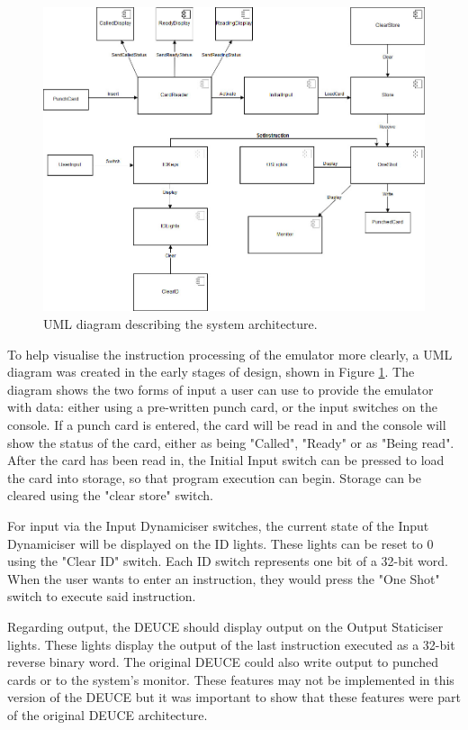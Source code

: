 \documentclass{l4proj}
\begin{document}
\begin{figure}[h]
	\centering
	\includegraphics[width=\linewidth]{images/deuce-uml}
	\caption{UML diagram describing the system architecture.}
	\label{fig:uml}
\end{figure}

To help visualise the instruction processing of the emulator more clearly, a UML diagram was created in the early stages of design, shown in Figure \ref{fig:uml}. The diagram shows the two forms of input a user can use to provide the emulator with data: either using a pre-written punch card, or the input switches on the console. If a punch card is entered, the card will be read in and the console will show the status of the card, either as being "Called", "Ready" or as "Being read". After the card has been read in, the Initial Input switch can be pressed to load the card into storage, so that program execution can begin. Storage can be cleared using the "clear store" switch.

For input via the Input Dynamiciser switches, the current state of the Input Dynamiciser will be displayed on the ID lights. These lights can be reset to 0 using the "Clear ID" switch. Each ID switch represents one bit of a 32-bit word. When the user wants to enter an instruction, they would press the "One Shot" switch to execute said instruction.

Regarding output, the DEUCE should display output on the Output Staticiser lights. These lights display the output of the last instruction executed as a 32-bit reverse binary word. The original DEUCE could also write output to punched cards or to the system's monitor. These features may not be implemented in this version of the DEUCE but it was important to show that these features were part of the original DEUCE architecture.
\end{document}

